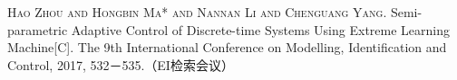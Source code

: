
\begin{publications}{99}

    \item\textsc{Hao Zhou and Hongbin Ma* and Nannan Li and Chenguang Yang}. {Semi-parametric Adaptive Control of Discrete-time Systems Using Extreme Learning Machine}[C].
      The 9th International Conference on Modelling, Identification and Control, 2017, 532－535.（EI检索会议）
    
\end{publications}
